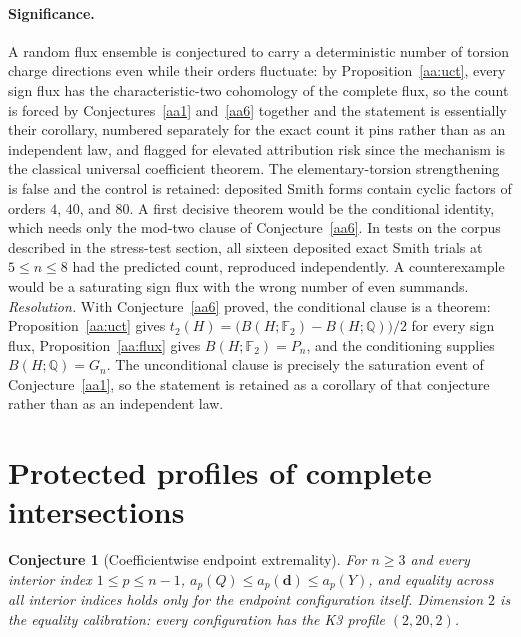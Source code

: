 \documentclass[11pt]{article}
\newtheorem{conjecture}{Conjecture}
\theoremstyle{definition}
\begin{document}
\paragraph{Significance.}
A random flux ensemble is conjectured to carry a deterministic number of torsion charge directions even while their orders fluctuate: by Proposition~\ref{aa:uct}, every sign flux has the characteristic-two cohomology of the complete flux, so the count is forced by Conjectures~\ref{aa1} and~\ref{aa6} together and the statement is essentially their corollary, numbered separately for the exact count it pins rather than as an independent law, and flagged for elevated attribution risk since the mechanism is the classical universal coefficient theorem.  The elementary-torsion strengthening is false and the control is retained: deposited Smith forms contain cyclic factors of orders $4$, $40$, and $80$.  A first decisive theorem would be the conditional identity, which needs only the mod-two clause of Conjecture~\ref{aa6}.  In tests on the corpus described in the stress-test section, all sixteen deposited exact Smith trials at $5\le n\le8$ had the predicted count, reproduced independently.  A counterexample would be a saturating sign flux with the wrong number of even summands.  \emph{Resolution.} With Conjecture~\ref{aa6} proved, the conditional clause is a theorem: Proposition~\ref{aa:uct} gives $t_2(H)=\bigl(B(H;\mathbb F_2)-B(H;\mathbb Q)\bigr)/2$ for every sign flux, Proposition~\ref{aa:flux} gives $B(H;\mathbb F_2)=P_n$, and the conditioning supplies $B(H;\mathbb Q)=G_n$.  The unconditional clause is precisely the saturation event of Conjecture~\ref{aa1}, so the statement is retained as a corollary of that conjecture rather than as an independent law.

\section{Protected profiles of complete intersections}

\begin{conjecture}[Coefficientwise endpoint extremality]\label{aa9}
For $n\ge3$ and every interior index $1\le p\le n-1$, $a_p(Q)\le a_p(\mathbf d)\le a_p(Y)$, and equality across all interior indices holds only for the endpoint configuration itself.  Dimension $2$ is the equality calibration: every configuration has the K3 profile $(2,20,2)$.
\end{conjecture}
\end{document}
